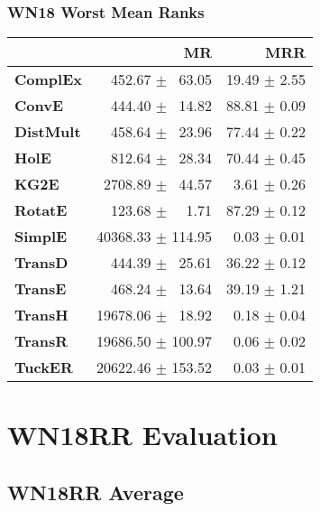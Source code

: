 \documentclass{article}
\begin{document}
\subsubsection{WN18 Worst Mean Ranks}
    \begin{center}
    \begin{tabular}{lrr}
\toprule
{} &                 MR &           MRR \\
\midrule
\textbf{ComplEx } &  $\phantom{5}$$\phantom{5}$452.67 $\pm$ $\phantom{5}$63.05 &  19.49 $\pm$ 2.55 \\
\textbf{ConvE   } &  $\phantom{5}$$\phantom{5}$444.40 $\pm$ $\phantom{5}$14.82 &  88.81 $\pm$ 0.09 \\
\textbf{DistMult} &  $\phantom{5}$$\phantom{5}$458.64 $\pm$ $\phantom{5}$23.96 &  77.44 $\pm$ 0.22 \\
\textbf{HolE    } &  $\phantom{5}$$\phantom{5}$812.64 $\pm$ $\phantom{5}$28.34 &  70.44 $\pm$ 0.45 \\
\textbf{KG2E    } &  $\phantom{5}$2708.89 $\pm$ $\phantom{5}$44.57 &  $\phantom{5}$3.61 $\pm$ 0.26 \\
\textbf{RotatE  } &  $\phantom{5}$$\phantom{5}$123.68 $\pm$ $\phantom{5}$$\phantom{5}$1.71 &  87.29 $\pm$ 0.12 \\
\textbf{SimplE  } &  40368.33 $\pm$ 114.95 &  $\phantom{5}$0.03 $\pm$ 0.01 \\
\textbf{TransD  } &  $\phantom{5}$$\phantom{5}$444.39 $\pm$ $\phantom{5}$25.61 &  36.22 $\pm$ 0.12 \\
\textbf{TransE  } &  $\phantom{5}$$\phantom{5}$468.24 $\pm$ $\phantom{5}$13.64 &  39.19 $\pm$ 1.21 \\
\textbf{TransH  } &  19678.06 $\pm$ $\phantom{5}$18.92 &  $\phantom{5}$0.18 $\pm$ 0.04 \\
\textbf{TransR  } &  19686.50 $\pm$ 100.97 &  $\phantom{5}$0.06 $\pm$ 0.02 \\
\textbf{TuckER  } &  20622.46 $\pm$ 153.52 &  $\phantom{5}$0.03 $\pm$ 0.01 \\
\bottomrule
\end{tabular}

    \end{center}

\section{WN18RR Evaluation}
\subsection{WN18RR Average}
\end{document}
